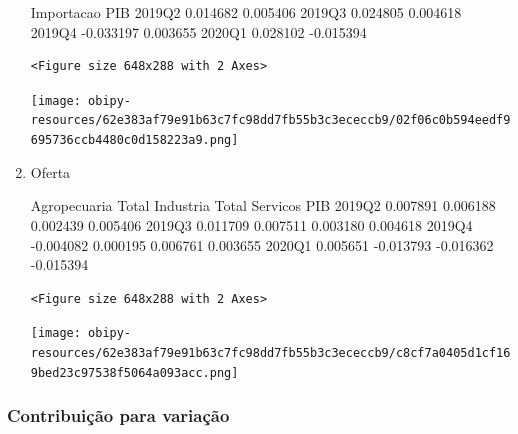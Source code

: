 \documentclass[11pt]{article}
\begin{document}
\begin{enumerate}
        Importacao       PIB  
2019Q2    0.014682  0.005406  
2019Q3    0.024805  0.004618  
2019Q4   -0.033197  0.003655  
2020Q1    0.028102 -0.015394  

\begin{verbatim}
<Figure size 648x288 with 2 Axes>
\end{verbatim}


\begin{center}
\texttt{[image: obipy-resources/62e383af79e91b63c7fc98dd7fb55b3c3ececcb9/02f06c0b594eedf9695736ccb4480c0d158223a9.png]}
\end{center}

\item Oferta
\label{sec:org559dc62}


        Agropecuaria  Total Industria  Total Servicos       PIB
2019Q2      0.007891         0.006188        0.002439  0.005406
2019Q3      0.011709         0.007511        0.003180  0.004618
2019Q4     -0.004082         0.000195        0.006761  0.003655
2020Q1      0.005651        -0.013793       -0.016362 -0.015394

\begin{verbatim}
<Figure size 648x288 with 2 Axes>
\end{verbatim}


\begin{center}
\texttt{[image: obipy-resources/62e383af79e91b63c7fc98dd7fb55b3c3ececcb9/c8cf7a0405d1cf169bed23c97538f5064a093acc.png]}
\end{center}
\end{enumerate}


\subsubsection{Contribuição para variação}
\label{sec:orgc9a0958}
\end{document}
